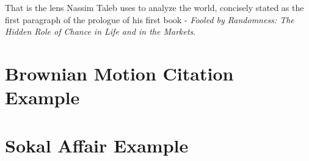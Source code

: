 \documentclass[hidelinks, 11pt, twocolumn]{article}
\begin{document}
That is the lens Nassim Taleb uses to analyze the world, concisely stated as the first paragraph of the prologue of his first book
- \textit{Fooled by Randomness: The Hidden Role of Chance in Life and in the Markets}.



\section{Brownian Motion Citation Example}
\blindtext \cite{Einstein_1905}

\section{Sokal Affair Example}
\blindtext[5] \cite{Sokal_1996}

\pagebreak


\end{document}
